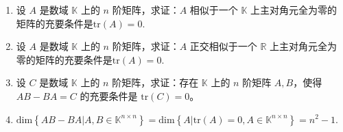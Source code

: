 \documentclass[../../main.tex]{subfiles}%
\begin{document}
\begin{proposition}[迹0矩阵与交换子]\label{proposition:迹零阵必相似于主对角全为零的矩阵}
\begin{enumerate}[(1)]
\item\label{proposition:迹零阵必相似于主对角全为零的矩阵-1} 设 $A$ 是数域 $\mathbb{K}$ 上的 $n$ 阶矩阵，求证：$A$ 相似于一个 $\mathbb{K}$ 上主对角元全为零的矩阵的充要条件是$\mathrm{tr}(A)=0$.

\item\label{proposition:迹零阵必相似于主对角全为零的矩阵-2} 设 $A$ 是数域 $\mathbb{K}$ 上的 $n$ 阶矩阵，求证：$A$ 正交相似于一个 $\mathbb{R}$ 上主对角元全为零的矩阵的充要条件是$\mathrm{tr}(A)=0$.

\item\label{proposition:迹零阵必相似于主对角全为零的矩阵-3} 设 $C$ 是数域 $\mathbb{K}$ 上的 $n$ 阶矩阵，求证：存在 $\mathbb{K}$ 上的 $n$ 阶矩阵 $A,B$，使得 $AB - BA = C$ 的充要条件是 $\mathrm{tr}(C)=0$。

\item\label{proposition:迹零阵必相似于主对角全为零的矩阵-4} $\mathrm{dim}\left\{ AB-BA|A,B\in \mathbb{K} ^{n\times n} \right\} =\mathrm{dim}\left\{ A|\mathrm{tr}\left( A \right) =0,A\in \mathbb{K}^{n\times n} \right\} =n^2-1.$
\end{enumerate}
\end{proposition}
\end{document}
